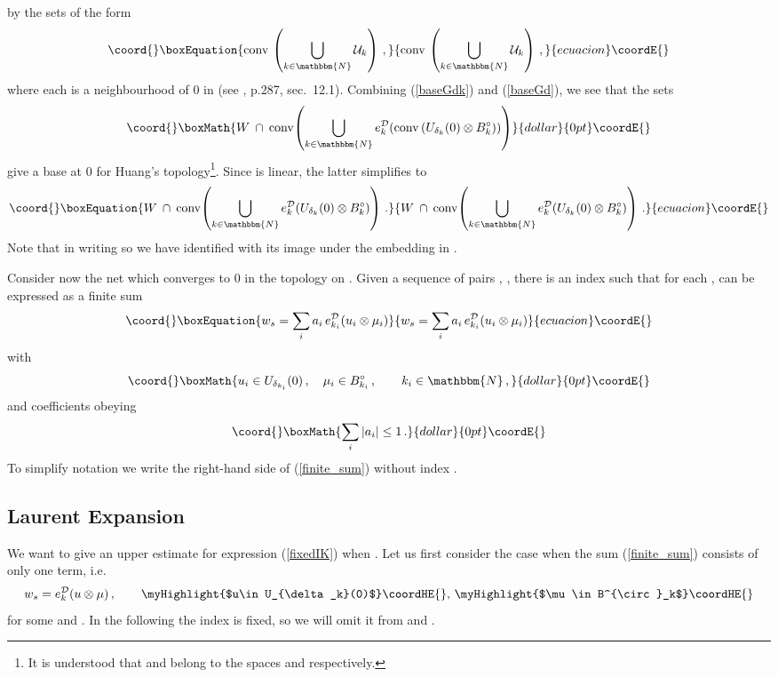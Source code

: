 \documentclass[a4paper,12pt,twoside]{article}
\renewcommand{\c}[1]{{\cal #1}}
\providecommand{\bN}{\mathbbm{N}}
\providecommand{\bC}{\mathbbm{C}}
\providecommand{\conv}{{\rm conv\,}}
\providecommand{\cT}{{\cal T}}
\providecommand{\eq}[1]{(\ref{#1})}
\providecommand{\D}{\c{D}}
\providecommand{\Hu}{{\rm Hu}}
\providecommand{\THud}{\cT_{\Hu}^{\D}}
\providecommand{\Fdd}{F^{\D{\textstyle *}}_k}
\providecommand{\ed}{e_k^{\D}}
\providecommand{\edi}{e_{k_i}^{\D}}
\providecommand{\Gdk}{G^{\D}_k}
\providecommand{\Gd}{G^{\D}}
\providecommand{\Bp}{B^{\circ}}
\begin{document}
by the sets of the form
\begin{equation}\coord{}\boxEquation{
\label{baseGd}
\conv\left(\bigcup_{k\in\bN}{\cal U}_k\right)\,,
}{
\conv\left(\bigcup_{k\in\bN}{\cal U}_k\right)\,,
}{ecuacion}\coordE{}\end{equation}
where each \coordHE{} is a neighbourhood of 0 in \myHighlight{$\Gdk$}\coordHE{}
(see \cite{Narici}, p.287, sec.\ 12.1).
Combining \eq{baseGdk} and \eq{baseGd}, we see that the sets
$$\coord{}\boxMath{W\:\cap\:\conv\!\!\left(\bigcup_{k\in\bN}\ed(\conv(U_{\delta_k}(0)\otimes\Bp_k))\right)}{dollar}{0pt}\coordE{}$$
give a base at 0 for Huang's topology\footnote
{It is understood that
\coordHE{} and \myHighlight{$\Bp_k$}\coordHE{} belong to the spaces \coordHE{}
and \myHighlight{$\Fdd$}\coordHE{} respectively.}. Since \myHighlight{$\ed$}\coordHE{} is linear, the latter simplifies
to
\begin{equation}\coord{}\boxEquation{
\label{baseW}
W\:\cap\: \conv\!\!\left(\bigcup_{k\in\bN}\ed(U_{\delta_k}(0)\otimes\Bp_k)\right)\,.
}{
W\:\cap\: \conv\!\!\left(\bigcup_{k\in\bN}\ed(U_{\delta_k}(0)\otimes\Bp_k)\right)\,.
}{ecuacion}\coordE{}\end{equation}
Note that in writing so we have
identified \coordHE{} with its image under the embedding in \myHighlight{$\Gd\subset\overline{\rm Hom}(W,\bC)$}\coordHE{}.

Consider now the net \coordHE{} which converges to 0 in the topology
\myHighlight{$\THud$}\coordHE{} on \coordHE{}. Given a sequence of pairs \coordHE{}, \myHighlight{$k\in\bN$}\coordHE{},
there is an index \coordHE{} such that for each \coordHE{}, \coordHE{} can
be expressed as a finite sum
\begin{equation}\coord{}\boxEquation{
\label{finite_sum}
w_s = \sum_i a_i\,\edi(u_i\otimes\mu_i)
}{
w_s = \sum_i a_i\,\edi(u_i\otimes\mu_i)
}{ecuacion}\coordE{}\end{equation}
with
$$\coord{}\boxMath{u_i\in U_{\delta_{k_i}}(0)\,,\quad\mu_i\in\Bp_{k_i}\,,\qquad k_i\in\bN\,,}{dollar}{0pt}\coordE{}$$
and coefficients obeying
$$\coord{}\boxMath{\sum_i |a_i| \le 1\,.}{dollar}{0pt}\coordE{}$$
To simplify notation we write the right-hand side of \eq{finite_sum} without
index \coordHE{}.
\subsection*{Laurent Expansion}
We want to give an upper estimate for expression \eq{fixedIK} when \coordHE{}.
Let us first consider
the case when
the sum \eq{finite_sum} consists of only one term, i.e.
$$w_s = \ed(u\otimes\mu)\,,\qquad\mbox{\myHighlight{$u\in U_{\delta_k}(0)$}\coordHE{}, \myHighlight{$\mu\in\Bp_k$}\coordHE{}}$$
for some \coordHE{} and \myHighlight{$k\in\bN$}\coordHE{}.
In the following the index \coordHE{} is fixed, so we will omit it from
\coordHE{} and \coordHE{}.
\end{document}
